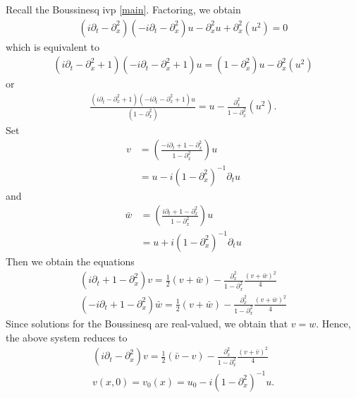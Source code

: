 \documentclass{amsart}
\newcommand{\p}{\partial}
\begin{document}
\section{}
Recall the Boussinesq ivp \eqref{main}. Factoring, we obtain
%
%
\begin{equation*}
\begin{split}
  (i \p_{t} - \p_{x}^{2})(-i \p_{t} - \p_{x}^{2})u - \p_{x}^{2} u +
  \p_{x}^{2}(u^{2}) = 0
\end{split}
\end{equation*}
%
%
which is equivalent to
%
%
\begin{equation*}
\begin{split}
  (i \p_{t} - \p_{x}^{2} + 1)(-i \p_{t} - \p_{x}^{2} +1)u = (1 -
  \p_{x}^{2})u - \p_{x}^{2}(u^{2})
\end{split}
\end{equation*}
%
%
or
%
%
\begin{equation*}
\begin{split}
  \frac{(i \p_{t} - \p_{x}^{2} + 1)(-i \p_{t} - \p_{x}^{2} +1)u}{(1 -
  \p_{x}^{2})} = u - \frac{\p_{x}^{2}}{1 - \p_{x}^{2}}(u^{2}). 
\end{split}
\end{equation*}
%
%
Set
%
%
\begin{equation*}
\begin{split}
  v & = \left( \frac{-i \p_{t} + 1 -\p_{x}^{2}}{1 - \p_{x}^{2}} \right)u
  \\
  & = u - i(1 - \p_{x}^{2})^{-1} \p_{t}u
\end{split}
\end{equation*}
and
\begin{equation*}
  \begin{split}
    \bar{w} & = \left( \frac{i \p_{t} + 1 -\p_{x}^{2}}{1 - \p_{x}^{2}} \right)u
  \\
  & = u + i(1 - \p_{x}^{2})^{-1} \p_{t}u
\end{split}
\end{equation*}
%
Then we obtain the equations
\begin{gather*}
  (i \p_{t} + 1 - \p_{x}^{2})v = \frac{1}{2}(v + \bar{w}) -
  \frac{\p_{x}^{2}}{1 - \p_{x}^{2}} \frac{(v + \bar{w})^{2}}{4}
  \\
  (-i \p_{t} + 1 - \p_{x}^{2})\bar{w}= \frac{1}{2}(v + \bar{w}) -
  \frac{\p_{x}^{2}}{1 - \p_{x}^{2}} \frac{(v + \bar{w})^{2}}{4}
\end{gather*}
%
Since solutions for the Boussinesq are real-valued, we obtain that $v=w$. Hence,
the above system reduces to
\begin{gather}
  \label{simp-sys}
  (i \p_{t} - \p_{x}^{2})v = \frac{1}{2}(\bar{v} -v) -
  \frac{\p_{x}^{2}}{1 - \p_{x}^{2}} \frac{(v + \bar{v})^{2}}{4}
  \\
  v(x,0) = v_{0}(x) = u_{0} - i(1 - \p_{x}^{2})^{-1}u.
  \label{simp-sys-init}
\end{gather}
\end{document}
